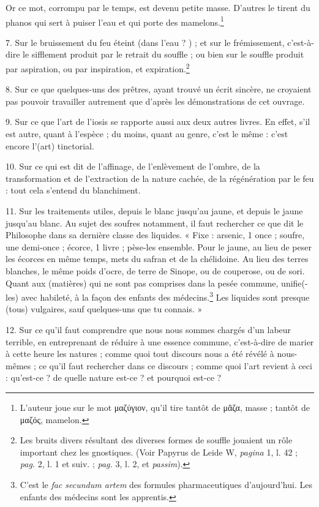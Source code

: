 \documentclass[landscape, a4paper, 11pt, oneside, polutonikogreek, french]{article}
\begin{document}
Or ce mot, corrompu par le temps, est devenu petite masse. D'autres le tirent du phanos qui sert à puiser l'eau et qui porte des mamelons.\footnote{L'auteur joue sur le mot μαζύγιον, qu'il tire tantôt de μᾶζα, masse ; tantôt de μαζός, mamelon.}

7. Sur le bruissement du feu éteint (dans l'eau ? ) ; et sur le frémissement, c'est-à-dire le sifflement produit par le retrait du souffle ; ou bien sur le souffle produit par aspiration, ou par inspiration, et expiration.\footnote{Les bruits divers résultant des diverses formes de souffle jouaient un rôle important chez les gnostiques. (Voir Papyrus de Leide W, \emph{pagina} 1, l. 42 ; \emph{pag.} 2, l. 1 et suiv. ; \emph{pag.} 3, l. 2, et \emph{passim}).}

8. Sur ce que quelques-uns des prêtres, ayant trouvé un écrit sincère, ne croyaient pas pouvoir travailler autrement que d'après les démonstrations de cet ouvrage.

9. Sur ce que l'art de l'iosis se rapporte aussi aux deux autres livres. En effet, s'il est autre, quant à l'espèce ; du moins, quant au genre, c'est le même : c'est encore l'(art) tinctorial.

10. Sur ce qui est dit de l'affinage, de l'enlèvement de l'ombre, de la transformation et de l'extraction de la nature cachée, de la régénération par le feu : tout cela s'entend du blanchiment.

11. Sur les traitements utiles, depuis le blanc jusqu'au jaune, et depuis le jaune jusqu'au blanc. Au sujet des soufres notamment, il faut rechercher ce que dit le Philosophe dans sa dernière classe des liquides. « Fixe : arsenic, 1 once ; soufre, une demi-once ; écorce, 1 livre ; pèse-les ensemble. Pour le jaune, au lieu de peser les écorces en même temps, mets du safran et de la chélidoine. Au lieu des terres blanches, le même poids d'ocre, de terre de Sinope, ou de couperose, ou de sori. Quant aux (matières) qui ne sont pas comprises dans la pesée commune, unifie(-les) avec habileté, à la façon des enfants des médecins.\footnote{C'est le \emph{fac secundum artem} des formules pharmaceutiques d'aujourd'hui. Les enfants des médecins sont les apprentis.} Les liquides sont presque (tous) vulgaires, sauf quelques-uns que tu connais. »

12. Sur ce qu'il faut comprendre que nous nous sommes chargés d'un labeur terrible, en entreprenant de réduire à une essence commune, c'est-à-dire de marier à cette heure les natures ; comme quoi tout discours nous a été révélé à nous-mêmes ; ce qu'il faut rechercher dans ce discours ; comme quoi l'art revient à ceci : qu'est-ce ? de quelle nature est-ce ? et pourquoi est-ce ?
\end{document}
